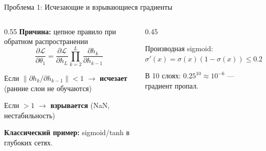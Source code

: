 \documentclass[aspectratio=169, 9pt]{beamer}
\begin{document}
\begin{frame}{Проблема 1: Исчезающие и взрывающиеся градиенты}
  \begin{columns}[T]
    \begin{column}{0.55\textwidth}
      \textbf{Причина:} цепное правило при обратном распространении
      \[
      \frac{\partial \mathcal{L}}{\partial \theta_1} = 
      \frac{\partial \mathcal{L}}{\partial h_L} \prod_{k=2}^{L} 
      \frac{\partial h_k}{\partial h_{k-1}}
      \]
      
      Если $\|\partial h_k / \partial h_{k-1}\| < 1$ $\to$ \textbf{исчезает} (ранние слои не обучаются)
      
      Если $> 1$ $\to$ \textbf{взрывается} (NaN, нестабильность)
      
      \vspace{0.3em}
      \textbf{Классический пример:} sigmoid/tanh в глубоких сетях.
    \end{column}
    \begin{column}{0.45\textwidth}
      \centering
      
      \vspace{0.3em}
      Производная sigmoid: $\sigma'(x) = \sigma(x)(1-\sigma(x)) \le 0.25$
      
      В 10 слоях: $0.25^{10} \approx 10^{-6}$ — градиент пропал.
    \end{column}
  \end{columns}
\end{frame}
\end{document}
